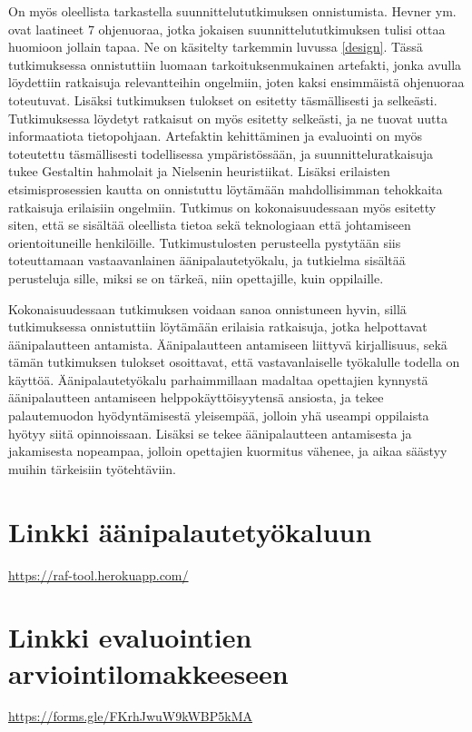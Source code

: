 \documentclass[utf8]{gradu3}
\begin{document}
On myös oleellista tarkastella suunnittelututkimuksen onnistumista. Hevner ym. \parencite*{hevner2004} ovat laatineet 7 ohjenuoraa, jotka jokaisen suunnittelututkimuksen tulisi ottaa huomioon jollain tapaa. Ne on käsitelty tarkemmin luvussa \ref{design}. Tässä tutkimuksessa onnistuttiin luomaan tarkoituksenmukainen artefakti, jonka avulla löydettiin ratkaisuja relevantteihin ongelmiin, joten kaksi ensimmäistä ohjenuoraa toteutuvat. Lisäksi tutkimuksen tulokset on esitetty täsmällisesti ja selkeästi. Tutkimuksessa löydetyt ratkaisut on myös esitetty selkeästi, ja ne tuovat uutta informaatiota tietopohjaan. Artefaktin kehittäminen ja evaluointi on myös toteutettu täsmällisesti todellisessa ympäristössään, ja suunnitteluratkaisuja tukee Gestaltin hahmolait ja Nielsenin heuristiikat. Lisäksi erilaisten etsimisprosessien kautta on onnistuttu löytämään mahdollisimman tehokkaita ratkaisuja erilaisiin ongelmiin. Tutkimus on kokonaisuudessaan myös esitetty siten, että se sisältää oleellista tietoa sekä teknologiaan että johtamiseen orientoituneille henkilöille. Tutkimustulosten perusteella pystytään siis toteuttamaan vastaavanlainen äänipalautetyökalu, ja tutkielma sisältää perusteluja sille, miksi se on tärkeä, niin opettajille, kuin oppilaille.

Kokonaisuudessaan tutkimuksen voidaan sanoa onnistuneen hyvin, sillä tutkimuksessa onnistuttiin löytämään erilaisia ratkaisuja, jotka helpottavat äänipalautteen antamista. Äänipalautteen antamiseen liittyvä kirjallisuus, sekä tämän tutkimuksen tulokset osoittavat, että vastavanlaiselle työkalulle todella on käyttöä. Äänipalautetyökalu parhaimmillaan madaltaa opettajien kynnystä äänipalautteen antamiseen helppokäyttöisyytensä ansiosta, ja tekee palautemuodon hyödyntämisestä yleisempää, jolloin yhä useampi oppilaista hyötyy siitä opinnoissaan. Lisäksi se tekee äänipalautteen antamisesta ja jakamisesta nopeampaa, jolloin opettajien kuormitus vähenee, ja aikaa säästyy muihin tärkeisiin työtehtäviin.

%

\printbibliography

\appendix

\section{Linkki äänipalautetyökaluun}
\label{tool}

\url{https://raf-tool.herokuapp.com/}

\section{Linkki evaluointien arviointilomakkeeseen}
\label{lomake}

\url{https://forms.gle/FKrhJwuW9kWBP5kMA}
\end{document}
